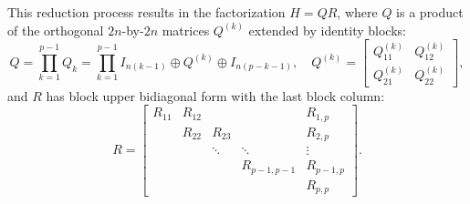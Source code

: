 \documentclass{llncs}
\begin{document}
This reduction process results in the factorization 
$H = QR$, where $Q$ is a product of 
the orthogonal $2n$-by-$2n$ matrices $Q^{(k)}$ extended 
by identity blocks: 
\begin{equation*} %
  Q = \prod_{k=1}^{p-1} Q_k = 
  \prod_{k=1}^{p-1} I_{n(k-1)}\oplus Q^{(k)} \oplus I_{n(p-k-1)}
  ,\quad %
  Q^{(k)} = 
  \begin{bmatrix}
    Q_{11}^{(k)} & Q_{12}^{(k)}\\
    Q_{21}^{(k)} & Q_{22}^{(k)}
  \end{bmatrix},
\end{equation*}
and $R$ has block upper bidiagonal form with 
the last block column:
\begin{equation}
  \label{eq:matr_R}
  R =
  \begin{bmatrix}
    R_{11} & R_{12} &         &             & R_{1,p} \\
           & R_{22} & R_{23}  &             & R_{2,p} \\
           &        & \ddots  & \ddots      &  \vdots \\
           &        &         & R_{p-1,p-1} & R_{p-1,p}  \\ 
           &        &         &             & R_{p,p}
  \end{bmatrix}.
\end{equation}
\end{document}
